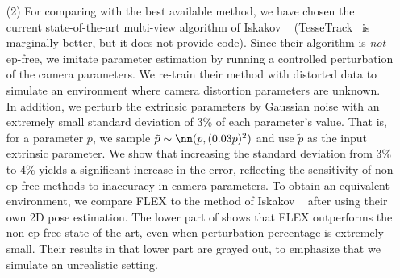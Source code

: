 \begin{enumerate}[nosep,leftmargin=0cm,itemindent=0.5cm,labelwidth=\itemindent,labelsep=0cm,align=left]
\item[(2)] 
For comparing with the best available method, 
we have chosen the current state-of-the-art multi-view algorithm of Iskakov \etal~\cite{iskakov2019learnable} (TesseTrack~\cite{Reddy2021TesseTrackEL} is marginally better, but it does not provide code). Since their algorithm is \emph{not} ep-free, we
imitate parameter estimation by running a controlled perturbation of the camera parameters.
We re-train their method with distorted data to simulate an environment where camera distortion parameters are unknown. 
In addition, we perturb the 
extrinsic parameters by Gaussian noise with an extremely small standard deviation of 3\% of each parameter's 
value. That is, for a parameter $p$, we sample $\tilde{p}\sim\nn(p,(0.03 p)^2)$ and use $\tilde{p}$ as the input extrinsic parameter. 
We show that increasing the standard deviation from 3\% to 4\% yields a significant increase in the error, reflecting the sensitivity of non ep-free methods to  inaccuracy in camera parameters.
To obtain an equivalent environment, we compare FLEX to the method of Iskakov \etal~ after using their own 2D pose estimation.
The lower part of  shows that FLEX outperforms the non ep-free state-of-the-art, even when perturbation percentage is extremely small.
Their results
in that lower part 
are grayed out, to emphasize that we simulate an unrealistic setting.
\end{enumerate}





